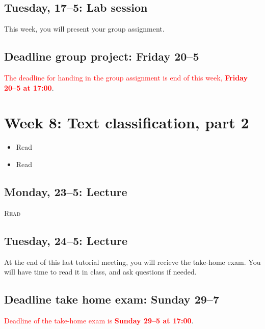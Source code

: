 \subsection*{Tuesday, 17--5: Lab session}
This week, you will present your group assignment. 

\subsection*{Deadline group project: Friday 20--5}
\textcolor{red}{The deadline for handing in the group assignment is end of this week, \textbf{Friday 20--5 at 17:00}}.


\section*{Week 8: Text classification, part 2}
\begin{itemize}
	\item{Read \cite{jordan_machine_2015}}
	\item{Read \cite{meppelink_reliable_2021}}
\end{itemize}


\subsection*{Monday, 23--5: Lecture}
\textsc{ Read \cite{van_zoonen_social_2016}}
\subsection*{Tuesday, 24--5: Lecture}
At the end of this last tutorial meeting, you will recieve the take-home exam. You will have time to read it in class, and ask questions if needed. \\

\subsection*{Deadline take home exam: Sunday 29--7}
\textcolor{red}{Deadline of the take-home exam is \textbf{Sunday 29--5 at 17:00}}.







